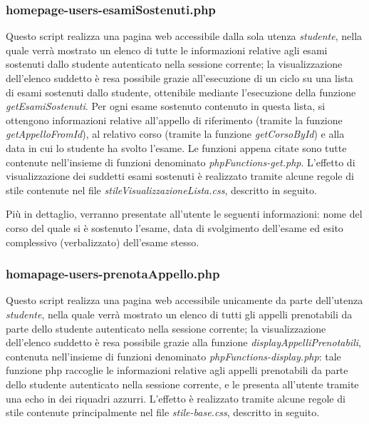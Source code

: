 \documentclass [a4paper,11pt]{book}
\begin{document}
\medskip

\subsubsection{homepage-users-esamiSostenuti.php}

Questo script realizza una pagina web accessibile dalla sola utenza \emph{studente}, nella quale verrà mostrato un elenco di tutte le informazioni relative agli esami sostenuti dallo studente autenticato nella sessione corrente; la visualizzazione dell'elenco suddetto è resa possibile grazie all'esecuzione di un ciclo su una lista di esami sostenuti dallo studente, ottenibile mediante l'esecuzione della funzione \emph{getEsamiSostenuti}. Per ogni esame sostenuto contenuto in questa lista, si ottengono informazioni relative all'appello di riferimento (tramite la funzione \emph{getAppelloFromId}), al relativo corso (tramite la funzione \emph{getCorsoById}) e alla data in cui lo studente ha svolto l'esame. Le funzioni appena citate sono tutte contenute nell'insieme di funzioni denominato \emph{phpFunctions-get.php}. L'effetto di visualizzazione dei suddetti esami sostenuti è realizzato tramite alcune regole di stile contenute nel file \emph{stileVisualizzazioneLista.css}, descritto in seguito.

Più in dettaglio, verranno presentate all'utente le seguenti informazioni: nome del corso del quale si è sostenuto l'esame, data di svolgimento dell'esame ed esito complessivo (verbalizzato) dell'esame stesso.

\medskip

\subsubsection{homapage-users-prenotaAppello.php}

Questo script realizza una pagina web accessibile unicamente da parte dell'utenza \emph{studente}, nella quale verrà mostrato un elenco di tutti gli appelli prenotabili da parte dello studente autenticato nella sessione corrente; la visualizzazione dell'elenco suddetto è resa possibile grazie alla funzione \emph{displayAppelliPrenotabili}, contenuta nell'insieme di funzioni denominato \emph{phpFunctions-display.php}: tale funzione php raccoglie le informazioni relative agli appelli prenotabili da parte dello studente autenticato nella sessione corrente, e le presenta all'utente tramite una echo in dei riquadri azzurri. L'effetto è realizzato tramite alcune regole di stile contenute principalmente nel file \emph{stile-base.css}, descritto in seguito.
\end{document}
